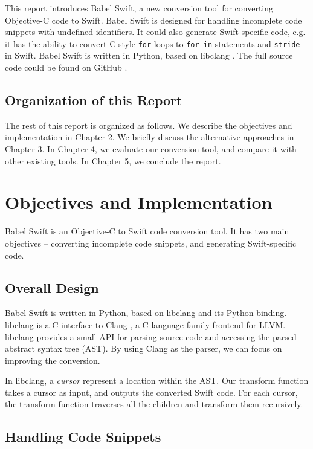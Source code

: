 \documentclass{sfuthesis}
\begin{document}
This report introduces Babel Swift, a new conversion tool for converting Objective-C code to Swift. Babel Swift is designed for handling incomplete code snippets with undefined identifiers. It could also generate Swift-specific code, e.g. it has the ability to convert C-style \texttt{for} loops to \texttt{for-in} statements and \texttt{stride} in Swift. Babel Swift is written in Python, based on libclang \cite{libclang}. The full source code could be found on GitHub \cite{babelswift}.

\section{Organization of this Report}

The rest of this report is organized as follows. We describe the objectives and implementation in Chapter 2. We briefly discuss the alternative approaches in Chapter 3. In Chapter 4, we evaluate our conversion tool, and compare it with other existing tools. In Chapter 5, we conclude the report.

\chapter{Objectives and Implementation}

Babel Swift is an Objective-C to Swift code conversion tool. It has two main objectives -- converting incomplete code snippets, and generating Swift-specific code.

\section{Overall Design}

Babel Swift is written in Python, based on libclang \cite{libclang} and its Python binding. libclang is a C interface to Clang \cite{clang}, a C language family frontend for LLVM. libclang provides a small API for parsing source code and accessing the parsed abstract syntax tree (AST). By using Clang as the parser, we can focus on improving the conversion.

In libclang, a \emph{cursor} represent a location within the AST. Our transform function takes a cursor as input, and outputs the converted Swift code. For each cursor, the transform function traverses all the children and transform them recursively.

\section{Handling Code Snippets}
\end{document}
